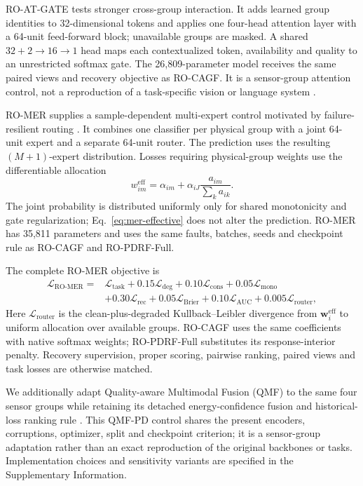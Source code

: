 \documentclass[11pt]{article}
\begin{document}
RO-AT-GATE tests stronger cross-group interaction. It adds learned group identities to 32-dimensional tokens and applies one four-head attention layer with a 64-unit feed-forward block; unavailable groups are masked. A shared $32+2\rightarrow16\rightarrow1$ head maps each contextualized token, availability and quality to an unrestricted softmax gate. The 26,809-parameter model receives the same paired views and recovery objective as RO-CAGF. It is a sensor-group attention control, not a reproduction of a task-specific vision or language system \citep{li2024umdf,gao2024aleatoric,cho2025cocoon}.

RO-MER supplies a sample-dependent multi-expert control motivated by failure-resilient routing \citep{park2025mome}. It combines one classifier per physical group with a joint 64-unit expert and a separate 64-unit router. The prediction uses the resulting $(M+1)$-expert distribution. Losses requiring physical-group weights use the differentiable allocation
\begin{equation}
w^{\mathrm{eff}}_{im}=\alpha_{im}+\alpha_{iJ}\frac{a_{im}}{\sum_k a_{ik}}.
\label{eq:mer-effective}
\end{equation}
The joint probability is distributed uniformly only for shared monotonicity and gate regularization; Eq.~\eqref{eq:mer-effective} does not alter the prediction. RO-MER has 35,811 parameters and uses the same faults, batches, seeds and checkpoint rule as RO-CAGF and RO-PDRF-Full.

The complete RO-MER objective is
\begin{equation}
\begin{aligned}
\mathcal L_{\mathrm{RO\text{-}MER}}={}&\mathcal L_{\mathrm{task}}+0.15\mathcal L_{\mathrm{deg}}+0.10\mathcal L_{\mathrm{cons}}+0.05\mathcal L_{\mathrm{mono}}\\
&+0.30\mathcal L_{\mathrm{rec}}+0.05\mathcal L_{\mathrm{Brier}}+0.10\mathcal L_{\mathrm{AUC}}+0.005\mathcal L_{\mathrm{router}},
\end{aligned}
\label{eq:mer-objective}
\end{equation}
Here $\mathcal L_{\mathrm{router}}$ is the clean-plus-degraded Kullback--Leibler divergence from $\mathbf w_i^{\mathrm{eff}}$ to uniform allocation over available groups. RO-CAGF uses the same coefficients with native softmax weights; RO-PDRF-Full substitutes its response-interior penalty. Recovery supervision, proper scoring, pairwise ranking, paired views and task losses are otherwise matched.

We additionally adapt Quality-aware Multimodal Fusion (QMF) to the same four sensor groups while retaining its detached energy-confidence fusion and historical-loss ranking rule \citep{zhang2023qmf}. This QMF-PD control shares the present encoders, corruptions, optimizer, split and checkpoint criterion; it is a sensor-group adaptation rather than an exact reproduction of the original backbones or tasks. Implementation choices and sensitivity variants are specified in the Supplementary Information.
\end{document}
